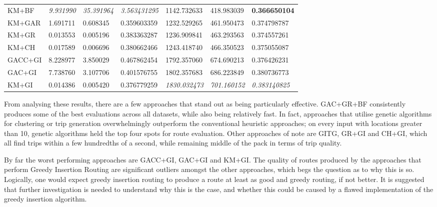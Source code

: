 \begin{table}[H]
\begin{tabular}{lllllll}
        KM+BF      & \textit{9.931990}        & \textit{35.391964}          & \textit{3.563431295}                    & 1142.732633        & 418.983039            & \textbf{0.366650104}              \\
        KM+GAR     & 1.691711                 & 0.608345                    & 0.359603359                             & 1232.529265        & 461.950473            & 0.374798787                       \\
        KM+GR      & 0.013553                 & 0.005196                    & 0.383363287                             & 1236.909841        & 463.293563            & 0.374557261                       \\
        KM+CH      & 0.017589                 & 0.006696                    & 0.380662466                             & 1243.418740        & 466.350523            & 0.375055087                       \\
        GACC+GI    & 8.228977                 & 3.850029                    & 0.467862454                             & 1792.357060        & 674.690213            & 0.376426231                       \\
        GAC+GI     & 7.738760                 & 3.107706                    & 0.401576755                             & 1802.357683        & 686.223849            & 0.380736773                       \\
        KM+GI      & 0.014386                 & 0.005420                    & 0.376779259                             & \textit{1830.032473} & \textit{701.160152} & \textit{0.383140825}
    \end{tabular}
\end{table}
From analysing these results, there are a few approaches that stand out as being particularly effective.
GAC+GR+BF consistently produces some of the best evaluations across all datasets, while also being relatively fast.
In fact, approaches that utilise genetic algorithms for clustering or trip generation overwhelmingly outperform the
conventional heuristic approaches; on every input with locations greater than 10, genetic algorithms held the top
four spots for route evaluation.
Other approaches of note are GITG, GR+GI and CH+GI, which all find trips within a few hundredths of a second, while
remaining middle of the pack in terms of trip quality.

By far the worst performing approaches are GACC+GI, GAC+GI and KM+GI\@.
The quality of routes produced by the approaches that perform Greedy Insertion Routing are significant outliers amongst
the other approaches, which begs the question as to why this is so.
Logically, one would expect greedy insertion routing to produce a route at least as good and greedy routing, if not better.
It is suggested that further investigation is needed to understand why this is the case, and whether this could be
caused by a
flawed implementation of the greedy insertion algorithm.

